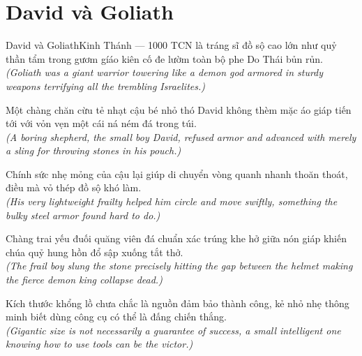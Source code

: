 \section{David và Goliath}
\begin{truyen}{David và Goliath}{Kinh Thánh --- 1000 TCN}
 là tráng sĩ đồ sộ cao lớn như quỷ thần tẩm trong gươm gíáo kiên cố đe lườm toàn bộ phe Do Thái bủn rủn.\\[4pt]
\textit{(Goliath was a giant warrior towering like a demon god armored in sturdy weapons terrifying all the trembling Israelites.)}

Một chàng chăn cừu tẻ nhạt cậu bé nhỏ thó David không thèm mặc áo giáp tiến tới với vỏn vẹn một cái ná ném đá trong túi.\\[4pt]
\textit{(A boring shepherd, the small boy David, refused armor and advanced with merely a sling for throwing stones in his pouch.)}

Chính sức nhẹ mỏng của cậu lại giúp di chuyển vòng quanh nhanh thoăn thoát, điều mà vỏ thép đồ sộ khó làm.\\[4pt]
\textit{(His very lightweight frailty helped him circle and move swiftly, something the bulky steel armor found hard to do.)}

Chàng trai yếu đuối quăng viên đá chuẩn xác trúng khe hở giữa nón giáp khiến chúa quỷ hung hồn đổ sập xuống tắt thở.\\[4pt]
\textit{(The frail boy slung the stone precisely hitting the gap between the helmet making the fierce demon king collapse dead.)}

\end{truyen}
\begin{baihoc}
  Kích thước khổng lồ chưa chắc là nguồn đảm bảo thành công, kẻ nhỏ nhẹ thông minh biết dùng công cụ có thể là đấng chiến thắng.\\[4pt]
  \textit{(Gigantic size is not necessarily a guarantee of success, a small intelligent one knowing how to use tools can be the victor.)}
\end{baihoc}
